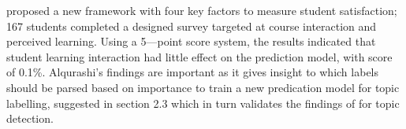 \textcite{alqurashi2019predicting} proposed a new framework with four key factors to measure student satisfaction; 167 students completed a designed survey targeted at course interaction and perceived learning. Using a 5---point score system, the results indicated that student learning interaction had little effect on the prediction model, with score of 0.1\%. Alqurashi’s findings are important as it gives insight to which labels should be parsed based on importance to train a new predication model for topic labelling, suggested in section 2.3 which in turn validates the findings of \parencite{unankard2019topic} for topic detection.
